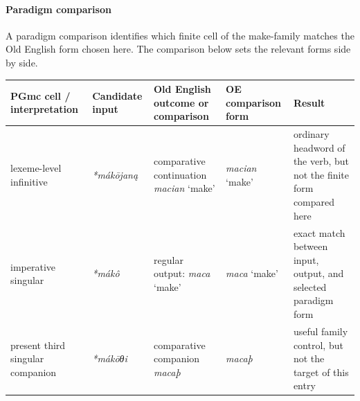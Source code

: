 \documentclass[
  british,
  a4paper,
]{article}
\newcounter{none} %
\begin{document}
\paragraph{Paradigm comparison}\label{paradigm-comparison-17}

A paradigm comparison identifies which finite cell of the make-family
matches the Old English form chosen here. The comparison below sets the
relevant forms side by side.

{\def\LTcaptype{none} %
\begin{longtable}[]{@{}
  >{\raggedright\arraybackslash}p{}
  >{\raggedright\arraybackslash}p{}
  >{\raggedright\arraybackslash}p{}
  >{\raggedright\arraybackslash}p{}
  >{\raggedright\arraybackslash}p{}@{}}
\toprule\noalign{}
\begin{minipage}[b]{\linewidth}\raggedright
PGmc cell / interpretation
\end{minipage} & \begin{minipage}[b]{\linewidth}\raggedright
Candidate input
\end{minipage} & \begin{minipage}[b]{\linewidth}\raggedright
Old English outcome or comparison
\end{minipage} & \begin{minipage}[b]{\linewidth}\raggedright
OE comparison form
\end{minipage} & \begin{minipage}[b]{\linewidth}\raggedright
Result
\end{minipage} \\
\midrule\noalign{}
\endhead
\bottomrule\noalign{}
\endlastfoot
lexeme-level infinitive & {\emph{*mákōjaną}} & comparative continuation
{\emph{macian}} `make' & {\emph{macian}} `make' & ordinary headword of
the verb, but not the finite form compared here \\
imperative singular & {\emph{*mákô}} & regular output: {\emph{maca}}
`make' & {\emph{maca}} `make' & exact match between input, output, and
selected paradigm form \\
present third singular companion & {\emph{*mákōθi}} & comparative
companion {\emph{macaþ}} & {\emph{macaþ}} & useful family control, but
not the target of this entry \\
\end{longtable}
}
\end{document}
